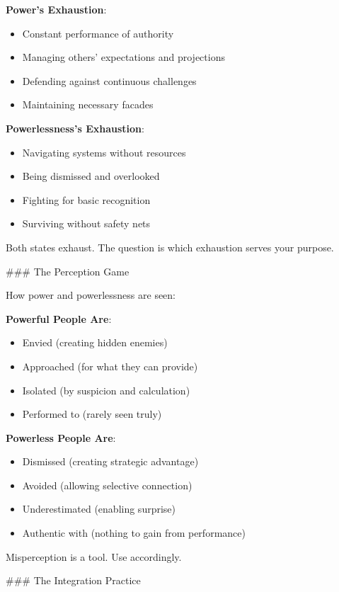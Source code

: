 \documentclass[12pt]{book}
\begin{document}
\textbf{Power's Exhaustion}:
\begin{itemize}
\item Constant performance of authority
\item Managing others' expectations and projections
\item Defending against continuous challenges
\item Maintaining necessary facades

\end{itemize}
\textbf{Powerlessness's Exhaustion}:
\begin{itemize}
\item Navigating systems without resources
\item Being dismissed and overlooked
\item Fighting for basic recognition
\item Surviving without safety nets

\end{itemize}
Both states exhaust. The question is which exhaustion serves your purpose.

\#\#\# The Perception Game

How power and powerlessness are seen:

\textbf{Powerful People Are}:
\begin{itemize}
\item Envied (creating hidden enemies)
\item Approached (for what they can provide)
\item Isolated (by suspicion and calculation)
\item Performed to (rarely seen truly)

\end{itemize}
\textbf{Powerless People Are}:
\begin{itemize}
\item Dismissed (creating strategic advantage)
\item Avoided (allowing selective connection)
\item Underestimated (enabling surprise)
\item Authentic with (nothing to gain from performance)

\end{itemize}
Misperception is a tool. Use accordingly.

\#\#\# The Integration Practice
\end{document}
